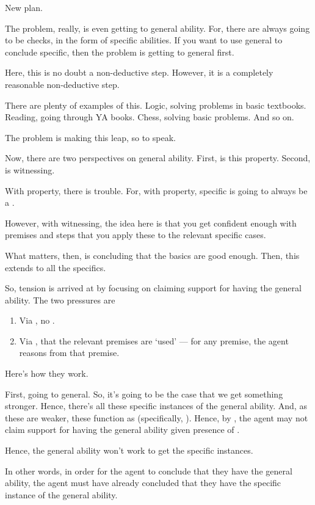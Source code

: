 \begin{note}
  \color{red}
  New plan.

  The problem, really, is even getting to general ability.
  For, there are always going to be checks, in the form of specific abilities.
  If you want to use general to conclude specific, then the problem is getting to general first.

  Here, this is no doubt a non-deductive step.
  However, it is a completely reasonable non-deductive step.

  There are plenty of examples of this.
  Logic, solving problems in basic textbooks.
  Reading, going through YA books.
  Chess, solving basic problems.
  And so on.

  The problem is making this leap, so to speak.

  Now, there are two perspectives on general ability.
  First, is this property.
  Second, is witnessing.

  With property, there is trouble.
  For, with property, specific is going to always be a \requ{}.

  However, with witnessing, the idea here is that you get confident enough with premises and steps that you apply these to the relevant specific cases.

  What matters, then, is concluding that the basics are good enough.
  Then, this extends to all the specifics.

  So, tension is arrived at by focusing on claiming support for having the general ability.
  The two pressures are
  \begin{enumerate}
  \item Via \ideaCS{}, no .
  \item Via \ESU{}, that the relevant premises are `used' --- for any premise, the agent reasons from that premise.
  \end{enumerate}
  Here's how they work.

  First, going to general.
  So, it's going to be the case that we get something stronger.
  Hence, there's all these specific instances of the general ability.
  And, as these are weaker, these function as  (specifically, ).
  Hence, by \ideaCS{}, the agent may not claim support for having the general ability given presence of .

  Hence, the general ability won't work to get the specific instances.

  In other words, in order for the agent to conclude that they have the general ability, the agent must have already concluded that they have the specific instance of the general ability.


\end{note}

